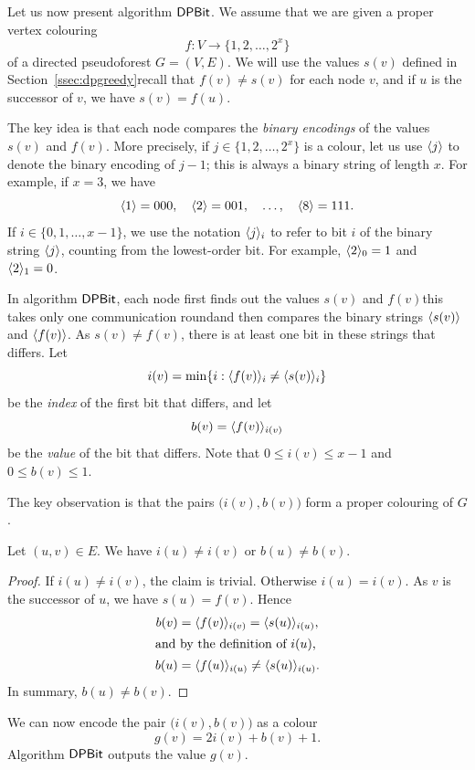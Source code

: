 Let us now present algorithm $\textsf{DPBit}$. We assume that we are given a proper vertex colouring
\[
    f \colon V \to \{ 1,2,\dotsc,2^x\}
\]    
of a directed pseudoforest $G = (V,E)$. We will use the values $s(v)$ defined in Section~\ref{ssec:dpgreedy}\mydash recall that $f(v) \ne s(v)$ for each node $v$, and if $u$ is the successor of $v$, we have $s(v) = f(u)$.

The key idea is that each node compares the \emph{binary encodings} of the values $s(v)$ and $f(v)$. More precisely, if $j \in \{1,2,\dotsc,2^x\}$ is a colour, let us use $\langle j \rangle$ to denote the binary encoding of $j-1$; this is always a binary string of length $x$. For example, if $x = 3$, we have
\[
    \langle 1 \rangle = 000,\quad
    \langle 2 \rangle = 001,\quad
    \dotsc, \quad
    \langle 8 \rangle = 111.
\]
If $i \in \{0,1,\dotsc,x-1\}$, we use the notation $\langle j \rangle_i$ to refer to bit $i$ of the binary string $\langle j \rangle$, counting from the lowest-order bit. For example, $\langle 2 \rangle_0 = 1$ and $\langle 2 \rangle_1 = 0$.

In algorithm $\textsf{DPBit}$, each node first finds out the values $s(v)$ and $f(v)$\mydash this takes only one communication round\mydash and then compares the binary strings $\langle s(v) \rangle$ and $\langle f(v) \rangle$. As $s(v) \ne f(v)$, there is at least one bit in these strings that differs. Let
\[
    i(v) = \min \{ i : \langle f(v) \rangle_i \ne \langle s(v) \rangle_i \}
\]
be the \emph{index} of the first bit that differs, and let
\[
    b(v) = \langle f(v) \rangle_{i(v)}
\]
be the \emph{value} of the bit that differs. Note that $0 \le i(v) \le x-1$ and $0 \le b(v) \le 1$.

The key observation is that the pairs $\bigl(i(v), b(v)\bigr)$ form a proper colouring of $G$.
\begin{lemma}\label{lem:dpbit}
    Let $(u,v) \in E$. We have $i(u) \ne i(v)$ or $b(u) \ne b(v)$.
\end{lemma}
\begin{proof}
    If $i(u) \ne i(v)$, the claim is trivial. Otherwise $i(u) = i(v)$. As $v$ is the successor of $u$, we have $s(u) = f(v)$. Hence
    \begin{align*}
        b(v) &= \langle f(v) \rangle_{i(v)} = \langle s(u) \rangle_{i(u)}, \\
    \intertext{and by the definition of $i(u)$,}
        b(u) &= \langle f(u) \rangle_{i(u)} \ne \langle s(u) \rangle_{i(u)}.
    \end{align*}
    In summary, $b(u) \ne b(v)$.
\end{proof}

We can now encode the pair $\bigl(i(v), b(v)\bigr)$ as a colour
\[
    g(v) = 2i(v) + b(v) + 1.
\]
Algorithm $\textsf{DPBit}$ outputs the value $g(v)$.

